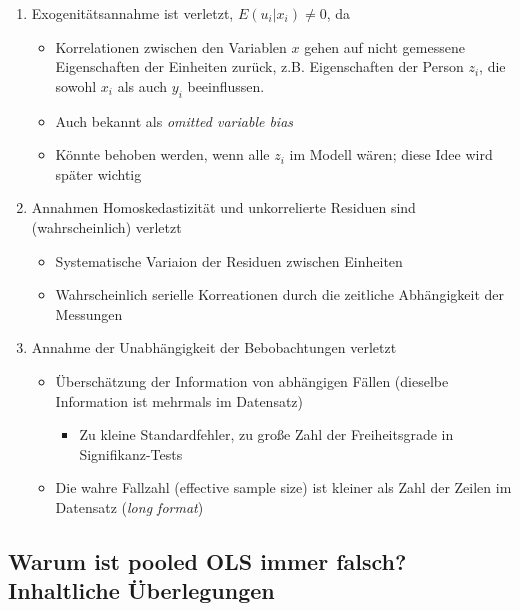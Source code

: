 \documentclass[]{book}
\providecommand{\tightlist}{%
  \setlength{\itemsep}{0pt}\setlength{\parskip}{0pt}}
\begin{document}
\begin{enumerate}
\def\labelenumi{\arabic{enumi})}
\tightlist
\item
  Exogenitätsannahme ist verletzt, \(E(u_i|x_i) \neq 0\), da

  \begin{itemize}
  \tightlist
  \item
    Korrelationen zwischen den Variablen \(x\) gehen auf nicht gemessene Eigenschaften der Einheiten zurück, z.B. Eigenschaften der Person \(z_i\), die sowohl \(x_i\) als auch \(y_i\) beeinflussen.
  \item
    Auch bekannt als \emph{omitted variable bias}
  \item
    Könnte behoben werden, wenn alle \(z_i\) im Modell wären; diese Idee wird später wichtig
  \end{itemize}
\item
  Annahmen Homoskedastizität und unkorrelierte Residuen sind (wahrscheinlich) verletzt

  \begin{itemize}
  \tightlist
  \item
    Systematische Variaion der Residuen zwischen Einheiten
  \item
    Wahrscheinlich serielle Korreationen durch die zeitliche Abhängigkeit der Messungen
  \end{itemize}
\item
  Annahme der Unabhängigkeit der Bebobachtungen verletzt

  \begin{itemize}
  \tightlist
  \item
    Überschätzung der Information von abhängigen Fällen (dieselbe Information ist mehrmals im Datensatz)

    \begin{itemize}
    \tightlist
    \item
      Zu kleine Standardfehler, zu große Zahl der Freiheitsgrade in Signifikanz-Tests
    \end{itemize}
  \item
    Die wahre Fallzahl (effective sample size) ist kleiner als Zahl der Zeilen im Datensatz (\emph{long format})
  \end{itemize}
\end{enumerate}

\hypertarget{warum-ist-pooled-ols-immer-falsch-inhaltliche-uxfcberlegungen}{%
\subsection*{Warum ist pooled OLS immer falsch? Inhaltliche Überlegungen}\label{warum-ist-pooled-ols-immer-falsch-inhaltliche-uxfcberlegungen}}
\end{document}
